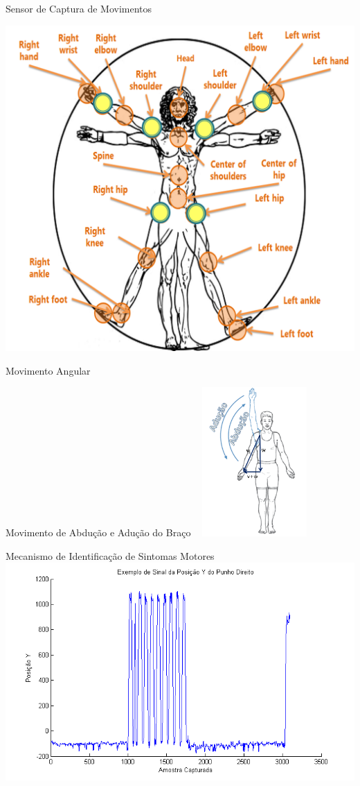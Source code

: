 \documentclass{beamer}
\begin{document}
\begin{frame}{Sensor de Captura de Movimentos}
  \begin{block}{}
      \center \includegraphics[height=2.5 in]{img/articulacoes-sel.png}
  \end{block}
\end{frame}

\begin{frame}{Movimento Angular}
  \begin{block}{Movimento de Abdução e Adução do Braço ~\cite{mcginnis2013biomechanics}}
      \center \includegraphics[width=4cm]{img/abducao-angulo.png}
  \end{block}
\end{frame}



\begin{frame}{Mecanismo de Identificação de Sintomas Motores}
      \center \includegraphics[height=2.8 in]{img/exsinalposicaoypunhodireito.png}
\end{frame}
\end{document}
